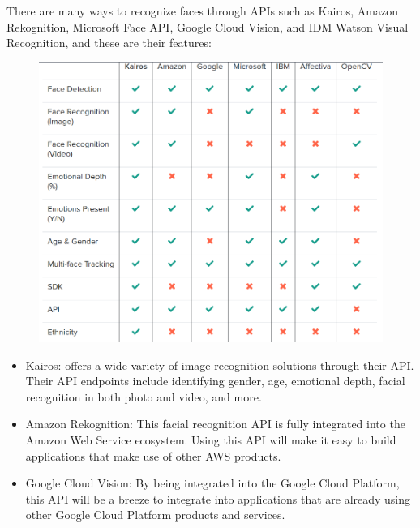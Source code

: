 There are many ways to recognize faces through APIs such as Kairos, Amazon Rekognition, Microsoft Face API, Google Cloud Vision, and IDM Watson Visual Recognition, and these are their features:
\begin{center}
	\begin{figure}[H]
		\centering
		\includegraphics[width=1\columnwidth]{images/chap3/face_api.png}
		\label{chap3:face_api_now}
	\end{figure}
\end{center}
\begin{itemize}
	\item  Kairos: offers a wide variety of image recognition solutions through their API. Their API endpoints include identifying gender, age, emotional depth, facial recognition in both photo and video, and more.
	\item Amazon Rekognition: This facial recognition API is fully integrated into the Amazon Web Service ecosystem. Using this API will make it easy to build applications that make use of other AWS products.
	\item Google Cloud Vision: By being integrated into the Google Cloud Platform, this API will be a breeze to integrate into applications that are already using other Google Cloud Platform products and services.
\end{itemize}

